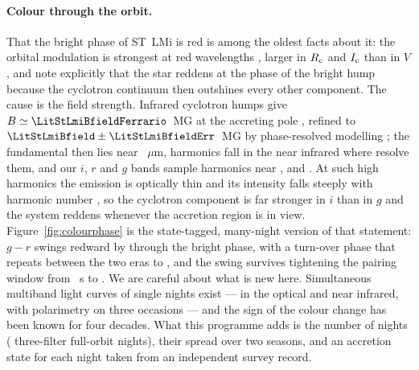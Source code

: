 \paragraph{Colour through the orbit.}
That the bright phase of ST~LMi is red is among the oldest facts about it:
the orbital modulation is strongest at red wavelengths
\citep{stockman1983, cropper1986}, larger in $R_{\rm c}$ and $I_{\rm c}$
\citep{peacock1992} than in $V$ \citep{kafka2007}, and \citet{kafka2007}
note explicitly that the star reddens at the phase of the bright hump
because the cyclotron continuum then outshines every other component.  The
cause is the field strength.  Infrared cyclotron humps give
$B \simeq \LitStLmiBfieldFerrario$~MG at the accreting pole
\citep{ferrario1993}, refined to
$\LitStLmiBfield \pm \LitStLmiBfieldErr$~MG by phase-resolved modelling
\citep{campbell2008c}; the fundamental then lies near
\LitStLmiCycFundamentalUm~$\mu$m, harmonics \LitStLmiIrHarmonics{} fall in
the near infrared where \citet{campbell2008c} resolve them, and our $i$,
$r$ and $g$ bands sample harmonics near \LitStLmiHarmonicI{},
\LitStLmiHarmonicR{} and \LitStLmiHarmonicG{}.  At such high harmonics the
emission is optically thin and its intensity falls steeply with harmonic
number \citep{chanmugam1981, wickramasinghe1985, wickramasinghe2000}, so
the cyclotron component is far stronger in $i$ than in $g$ and the system
reddens whenever the accretion region is in view.
Figure~\ref{fig:colourphase} is the state-tagged, many-night version of
that statement: $g-r$ swings redward by
through the bright phase, with a turn-over phase that repeats between the
two eras to
,
and the swing survives tightening the pairing window from
\NumColourPairWindowS{}~s to .
We are careful about what is new here.  Simultaneous multiband light curves
of single nights exist --- \citet{bailey1985} in the optical and near
infrared, \citet{peacock1992} with polarimetry on three occasions --- and
the sign of the colour change has been known for four decades.  What this
programme adds is the number of nights
(\NumStLmiThreeFilterNights{} three-filter full-orbit nights), their
spread over two seasons, and an accretion state for each night taken from
an independent survey record.

